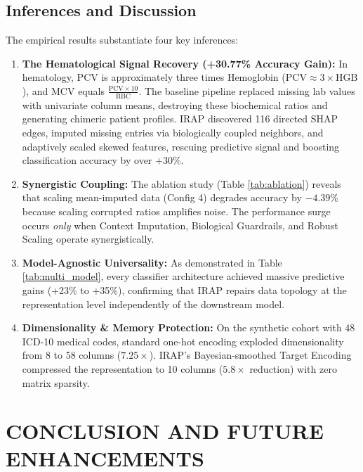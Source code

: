 \documentclass[MTech]{ugthesis}
\begin{document}
\section{Inferences and Discussion}
The empirical results substantiate four key inferences:
\begin{enumerate}
    \item \textbf{The Hematological Signal Recovery (+30.77\% Accuracy Gain):} In hematology, \ac{PCV} is approximately three times Hemoglobin ($\text{PCV} \approx 3 \times \text{HGB}$), and \ac{MCV} equals $\frac{\text{PCV} \times 10}{\text{RBC}}$. The baseline pipeline replaced missing lab values with univariate column means, destroying these biochemical ratios and generating chimeric patient profiles. \ac{IRAP} discovered 116 directed \ac{SHAP} edges, imputed missing entries via biologically coupled neighbors, and adaptively scaled skewed features, rescuing predictive signal and boosting classification accuracy by over +30\%.
    \item \textbf{Synergistic Coupling:} The ablation study (Table \ref{tab:ablation}) reveals that scaling mean-imputed data (Config 4) degrades accuracy by $-4.39\%$ because scaling corrupted ratios amplifies noise. The performance surge occurs \textit{only} when Context Imputation, Biological Guardrails, and Robust Scaling operate synergistically.
    \item \textbf{Model-Agnostic Universality:} As demonstrated in Table \ref{tab:multi_model}, every classifier architecture achieved massive predictive gains (+23\% to +35\%), confirming that \ac{IRAP} repairs data topology at the representation level independently of the downstream model.
    \item \textbf{Dimensionality & Memory Protection:} On the synthetic cohort with 48 ICD-10 medical codes, standard one-hot encoding exploded dimensionality from 8 to 58 columns ($7.25\times$). \ac{IRAP}'s Bayesian-smoothed Target Encoding compressed the representation to 10 columns ($5.8\times$ reduction) with zero matrix sparsity.
\end{enumerate}

\chapter{CONCLUSION AND FUTURE ENHANCEMENTS}
\label{chap:conclusion}
\end{document}
